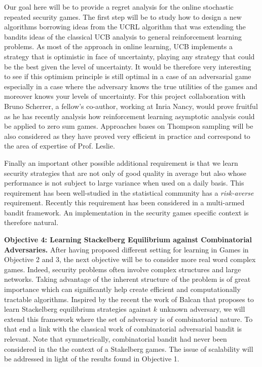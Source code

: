 Our goal here will be to provide a regret analysis for the online stochastic repeated security games. The first step will be to study  how to design a new algorithms borrowing ideas from the UCRL algorithm \cite{auer2009near} that was extending the bandits ideas of the classical UCB analysis to general reinforcement learning problems. As most of the approach in online learning, UCB implements a strategy that is optimistic in face of uncertainty, playing any strategy that could be the best given the level of uncertainty. It would be therefore very interesting to see if this optimism principle is still optimal in a case of an adversarial game especially in a case where the adversary knows the true utilities of the games and moreover knows your levels of uncertainty.
For this project collaboration with  Bruno Scherrer, a fellow's co-author, working at  Inria Nancy, would prove fruitful as he has recently analysis how reinforcement learning asymptotic analysis could be applied to zero sum games\cite{scherrerapproximate}.
Approaches bases on Thompson sampling\cite{russo2014information} will be also considered as they have proved very efficient in practice and correspond to the area of expertise of Prof. Leslie.

Finally an important other possible additional requirement is that we learn security strategies that are not only of good quality in average but also whose performance is not subject to large variance when used on a daily basis. This requirement has been well-studied in the statistical community has a \textit{risk-averse} requirement. Recently this requirement has been considered in a multi-armed bandit framework\cite{NIPS2012_4753}. An implementation in the security games specific context is therefore natural.




\textbf{Objective 4:  Learning Stackelberg Equilibrium against Combinatorial Adversaries.}
After having proposed different setting for learning in Games in Objective 2 and 3, the next  objective will be to consider more real word complex games. Indeed, security problems often involve complex structures and large networks. Taking advantage of the inherent structure of the problem is of great importance which can significantly help create efficient and computationally tractable algorithms. 
Inspired by the recent  the work of Balcan\cite{Balcan15CR} that proposes to learn Stackelberg equilibrium strategies against $k$ unknown adversary, we will extend this framework where the set of adversary is of combinatorial nature. To that end a link with the classical work of combinatorial adversarial bandit is relevant\cite{cesa2012combinatorial}. Note that symmetrically, combinatorial bandit had never been considered in the the context of a Stakelberg games.
The issue of scalability will be addressed in light of the results found in Objective 1.

